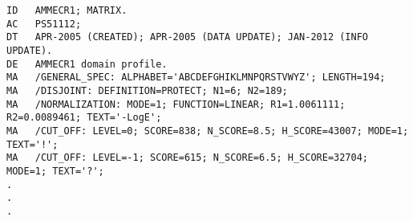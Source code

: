 \documentclass{article}
\begin{document}
{\normalsize
\begin{verbatim}
ID   AMMECR1; MATRIX.
AC   PS51112;
DT   APR-2005 (CREATED); APR-2005 (DATA UPDATE); JAN-2012 (INFO UPDATE).
DE   AMMECR1 domain profile.
MA   /GENERAL_SPEC: ALPHABET='ABCDEFGHIKLMNPQRSTVWYZ'; LENGTH=194;
MA   /DISJOINT: DEFINITION=PROTECT; N1=6; N2=189;
MA   /NORMALIZATION: MODE=1; FUNCTION=LINEAR; R1=1.0061111; R2=0.0089461; TEXT='-LogE';
MA   /CUT_OFF: LEVEL=0; SCORE=838; N_SCORE=8.5; H_SCORE=43007; MODE=1; TEXT='!';
MA   /CUT_OFF: LEVEL=-1; SCORE=615; N_SCORE=6.5; H_SCORE=32704; MODE=1; TEXT='?';
.
.
.
\end{verbatim}
}
\end{document}
